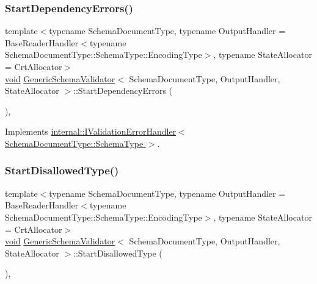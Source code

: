 \mbox{\label{classGenericSchemaValidator_a767f115cc90e0f2f5bdd1c9fbdbf75df}} 
\subsubsection{\texorpdfstring{Start\+Dependency\+Errors()}{StartDependencyErrors()}}
{\footnotesize\ttfamily template$<$typename Schema\+Document\+Type, typename Output\+Handler = Base\+Reader\+Handler$<$typename Schema\+Document\+Type\+::\+Schema\+Type\+::\+Encoding\+Type$>$, typename State\+Allocator = Crt\+Allocator$>$ \\
\hyperlink{imgui__impl__opengl3__loader_8h_ac668e7cffd9e2e9cfee428b9b2f34fa7}{void} \hyperlink{classGenericSchemaValidator}{Generic\+Schema\+Validator}$<$ Schema\+Document\+Type, Output\+Handler, State\+Allocator $>$\+::Start\+Dependency\+Errors (\begin{DoxyParamCaption}{ }\end{DoxyParamCaption})\hspace{0.3cm}{\ttfamily [inline]}, {\ttfamily [virtual]}}



Implements \hyperlink{classinternal_1_1IValidationErrorHandler_ab3cf4b9fe450ff76f52d70a2888f0342}{internal\+::\+I\+Validation\+Error\+Handler$<$ Schema\+Document\+Type\+::\+Schema\+Type $>$}.

\mbox{\label{classGenericSchemaValidator_a9904719420fd91200f80772e92fe225f}} 
\subsubsection{\texorpdfstring{Start\+Disallowed\+Type()}{StartDisallowedType()}}
{\footnotesize\ttfamily template$<$typename Schema\+Document\+Type, typename Output\+Handler = Base\+Reader\+Handler$<$typename Schema\+Document\+Type\+::\+Schema\+Type\+::\+Encoding\+Type$>$, typename State\+Allocator = Crt\+Allocator$>$ \\
\hyperlink{imgui__impl__opengl3__loader_8h_ac668e7cffd9e2e9cfee428b9b2f34fa7}{void} \hyperlink{classGenericSchemaValidator}{Generic\+Schema\+Validator}$<$ Schema\+Document\+Type, Output\+Handler, State\+Allocator $>$\+::Start\+Disallowed\+Type (\begin{DoxyParamCaption}{ }\end{DoxyParamCaption})\hspace{0.3cm}{\ttfamily [inline]}, {\ttfamily [virtual]}}



